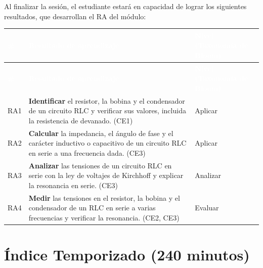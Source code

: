 \documentclass[11pt,letterpaper]{article}
\begin{document}
Al finalizar la sesión, el estudiante estará en capacidad de lograr los siguientes resultados, que desarrollan el RA del módulo:

\begin{xltabular}{\linewidth}{>{\raggedright\arraybackslash}p{1.1cm}>{\raggedright\arraybackslash}X>{\raggedright\arraybackslash}p{3.9cm}}
 \textcolor{white}{\textbf{\#}} & \textcolor{white}{\textbf{Resultado de aprendizaje}} & \textcolor{white}{\textbf{Nivel (Taxonomía de Bloom)}} \\
\endfirsthead
{} \textcolor{white}{\textbf{\#}} & \textcolor{white}{\textbf{Resultado de aprendizaje}} & \textcolor{white}{\textbf{Nivel (Taxonomía de Bloom)}} \\
\endhead
\bottomrule
\endlastfoot
  RA1 & \textbf{Identificar} el resistor, la bobina y el condensador de un circuito RLC y verificar sus valores, incluida la resistencia de devanado. (CE1) & Aplicar \\
   RA2 & \textbf{Calcular} la impedancia, el ángulo de fase y el carácter inductivo o capacitivo de un circuito RLC en serie a una frecuencia dada. (CE3) & Aplicar \\
  RA3 & \textbf{Analizar} las tensiones de un circuito RLC en serie con la ley de voltajes de Kirchhoff y explicar la resonancia en serie. (CE3) & Analizar \\
   RA4 & \textbf{Medir} las tensiones en el resistor, la bobina y el condensador de un RLC en serie a varias frecuencias y verificar la resonancia. (CE2, CE3) & Evaluar \\
\end{xltabular}

\section{Índice Temporizado (240 minutos)}
\end{document}
